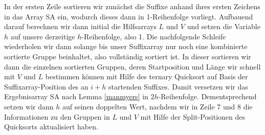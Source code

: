 In der ersten Zeile sortieren wir zunächst die Suffixe anhand ihres ersten Zeichens in das Array SA ein, wodurch dieses dann in 1-Reihenfolge vorliegt. Aufbauend darauf berechnen wir dann initial die Hilfsarrays $L$ und $V$ und setzen die Variable $h$ auf unsere derzeitige $h$-Reihenfolge, also 1.
Die nachfolgende Schleife wiederholen wir dann solange bis unser Suffixarray nur noch eine kombinierte sortierte Gruppe beinhaltet, also vollständig sortiert ist.
In dieser sortieren wir dann die einzelnen sortierten Gruppen, deren Startposition und Länge wir schnell mit $V$ und $L$ bestimmen können mit Hilfe des ternary Quicksort auf Basis der Suffixarray-Position des an $i+h$ startenden Suffixes. Damit versetzen wir das Ergebnisarray SA nach Lemma \ref{manmyers} in $2h$-Reihenfolge. Dementsprechend setzen wir dann $h$ auf seinen doppelten Wert, nachdem wir in Zeile 7 und 8 die Informationen zu den Gruppen in $L$ und $V$ mit Hilfe der Split-Positionen des Quicksorts aktualisiert haben.\\
